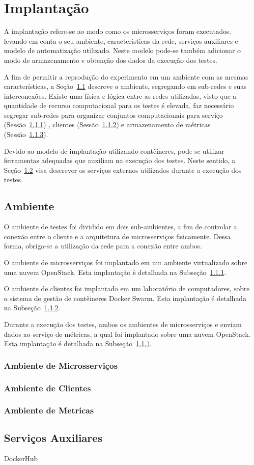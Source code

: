 \chapter{Implantação}
\label{cap6}

A implantação refere-se ao modo como os microsserviços foram executados, levando em conta o seu ambiente, caracteristicas da rede, serviços auxiliares e modelo de automatização utilizado.
%
Neste modelo pode-se também adicionar o modo de armazenamento e obtenção dos dados da execução dos testes.

A fim de permitir a reprodução do experimento em um ambiente com as mesmas características, a Seção~\ref{sec:ambiente} descreve o ambiente, segregando em sub-redes e suas interconexões.
%
Existe uma física e lógica entre as redes utilizadas, visto que a quantidade de recurso computacional para os testes é elevada, faz necessário segregar sub-redes para organizar conjuntos computacionais para serviço (Sessão~\ref{sec:ambiente_mic}) , clientes (Sessão~\ref{sec:ambiente_cli}) e armazenamento de métricas (Sessão~\ref{sec:ambiente_met}).

Devido ao modelo de implantação utilizando contêineres, pode-se utilizar ferramentas adequadas que auxiliam na execução dos testes.
%
Neste sentido, a Seção~\ref{sec:servicos_aux} visa descrever os serviços externos utilizados durante a execução dos testes.


\section{Ambiente}
\label{sec:ambiente}

O ambiente de testes foi dividido em dois sub-ambientes, a fim de controlar a conexão entre o cliente e a arquitetura de microsserviços fisicamente. Dessa forma, obriga-se a utilização da rede para a conexão entre ambos.

O ambiente de microsserviços foi implantado em um ambiente virtualizado sobre uma nuvem OpenStack.
%
Esta implantação é detalhada na Subseção~\ref{sec:ambiente_mic}.

O ambiente de clientes foi implantado em um laboratório de computadores, sobre o sistema de gestão de contêineres Docker Swarm.
%
Esta implantação é detalhada na Subseção~\ref{sec:ambiente_cli}.

Durante a execução dos testes, ambos os ambientes  de microsserviços e enviam dados ao serviço de métricas, a qual foi implantado sobre uma nuvem OpenStack.
%
Esta implantação é detalhada na Subseção~\ref{sec:ambiente_mic}.

\subsection{Ambiente de Microsserviços}
\label{sec:ambiente_mic}

\subsection{Ambiente de Clientes}
\label{sec:ambiente_cli}

\subsection{Ambiente de Metricas}
\label{sec:ambiente_met}

\section{Serviços Auxiliares}
\label{sec:servicos_aux}
DockerHub
